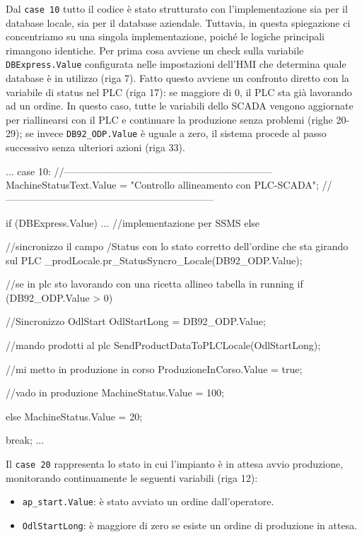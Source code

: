 Dal \verb|case 10| tutto il codice è stato strutturato con l'implementazione sia per il database locale, sia per il database aziendale. Tuttavia, in questa spiegazione ci concentriamo su una singola implementazione, poiché le logiche principali rimangono identiche. Per prima cosa avviene un check sulla variabile \verb|DBExpress.Value| configurata nelle impostazioni dell'HMI che determina quale database è in utilizzo (riga 7). Fatto questo avviene un confronto diretto con la variabile di status nel PLC (riga 17): se maggiore di 0, il PLC sta già lavorando ad un ordine. In questo caso, tutte le variabili dello SCADA vengono aggiornate per riallinearsi con il PLC e continuare la produzione senza problemi (righe 20-29); se invece \verb|DB92_ODP.Value| è uguale a zero, il sistema procede al passo successivo senza ulteriori azioni (riga 33). 
\begin{csharp}
...
    case 10:
    //---------------------------------------------------------------
    MachineStatusText.Value = "Controllo allineamento con PLC-SCADA";
    //---------------------------------------------------------------

    if (DBExpress.Value)
    {
       ... //implementazione per SSMS
    }
    else
    {
        //sincronizzo il campo /Status con lo stato corretto dell'ordine che sta girando sul PLC
        _prodLocale.pr_StatusSyncro_Locale(DB92_ODP.Value);

        //se in plc sto lavorando con una ricetta allineo tabella in running
        if (DB92_ODP.Value > 0)
        {
            //Sincronizzo OdlStart
            OdlStartLong = DB92_ODP.Value;

            //mando prodotti al plc
            SendProductDataToPLCLocale(OdlStartLong);

            //mi metto in produzione in corso 
            ProduzioneInCorso.Value = true;

            //vado in produzione
            MachineStatus.Value = 100;
        }
        else
        {
            MachineStatus.Value = 20;
        }
    }

    break;
...
\end{csharp}
Il \verb|case 20| rappresenta lo stato in cui l'impianto è in attesa avvio produzione, monitorando continuamente le seguenti variabili (riga 12): 
\begin{itemize}
    \item \verb|ap_start.Value|: è stato avviato un ordine dall'operatore.
    \item \verb|OdlStartLong|: è maggiore di zero se esiste un ordine di produzione in attesa.
\end{itemize}
